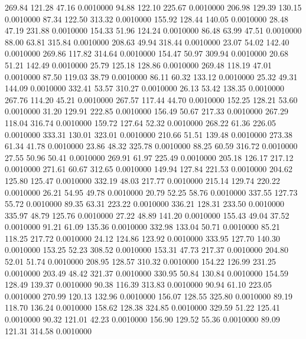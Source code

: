  269.84  121.28   47.16   0.0010000
  94.88  122.10  225.67   0.0010000
 206.98  129.39  130.15   0.0010000
  87.34  122.50  313.32   0.0010000
 155.92  128.44  140.05   0.0010000
  28.48   47.19  231.88   0.0010000
 154.33   51.96  124.24   0.0010000
  86.48   63.99   47.51   0.0010000
  88.00   63.81  315.84   0.0010000
 208.63   49.94  318.44   0.0010000
  23.07   54.02  142.40   0.0010000
 269.86  117.82  314.64   0.0010000
 154.47   50.97  309.94   0.0010000
  20.68   51.21  142.49   0.0010000
  25.79  125.18  128.86   0.0010000
 269.48  118.19   47.01   0.0010000
  87.50  119.03   38.79   0.0010000
  86.11   60.32  133.12   0.0010000
  25.32   49.31  144.09   0.0010000
 332.41   53.57  310.27   0.0010000
  26.13   53.42  138.35   0.0010000
 267.76  114.20   45.21   0.0010000
 267.57  117.44   44.70   0.0010000
 152.25  128.21   53.60   0.0010000
  31.20  129.91  222.85   0.0010000
 156.49   50.67  217.33   0.0010000
 267.29  118.04  316.74   0.0010000
 159.72  127.64   52.32   0.0010000
 268.22   61.36  226.05   0.0010000
 333.31  130.01  323.01   0.0010000
 210.66   51.51  139.48   0.0010000
 273.38   61.34   41.78   0.0010000
  23.86   48.32  325.78   0.0010000
  88.25   60.59  316.72   0.0010000
  27.55   50.96   50.41   0.0010000
 269.91   61.97  225.49   0.0010000
 205.18  126.17  217.12   0.0010000
 271.61   60.67  312.65   0.0010000
 149.94  127.84  221.53   0.0010000
 204.62  125.80  125.47   0.0010000
 332.19   48.03  217.77   0.0010000
 215.14  129.74  220.22   0.0010000
  26.21   54.95   49.78   0.0010000
  20.79   52.25   58.76   0.0010000
 337.55  127.73   55.72   0.0010000
  89.35   63.31  223.22   0.0010000
 336.21  128.31  233.50   0.0010000
 335.97   48.79  125.76   0.0010000
  27.22   48.89  141.20   0.0010000
 155.43   49.04   37.52   0.0010000
  91.21   61.09  135.36   0.0010000
 332.98  133.04   50.71   0.0010000
  85.21  118.25  217.72   0.0010000
  24.12  124.86  123.92   0.0010000
 333.95  127.70  140.30   0.0010000
 153.25   52.23  308.52   0.0010000
 153.31   47.73  217.37   0.0010000
 204.80   52.01   51.74   0.0010000
 208.95  128.57  310.32   0.0010000
 154.22  126.99  231.25   0.0010000
 203.49   48.42  321.37   0.0010000
 330.95   50.84  130.84   0.0010000
 154.59  128.49  139.37   0.0010000
  90.38  116.39  313.83   0.0010000
  90.94   61.10  223.05   0.0010000
 270.99  120.13  132.96   0.0010000
 156.07  128.55  325.80   0.0010000
  89.19  118.70  136.24   0.0010000
 158.62  128.38  324.85   0.0010000
 329.59   51.22  125.41   0.0010000
  90.32  121.01   42.23   0.0010000
 156.90  129.52   55.36   0.0010000
  89.09  121.31  314.58   0.0010000
